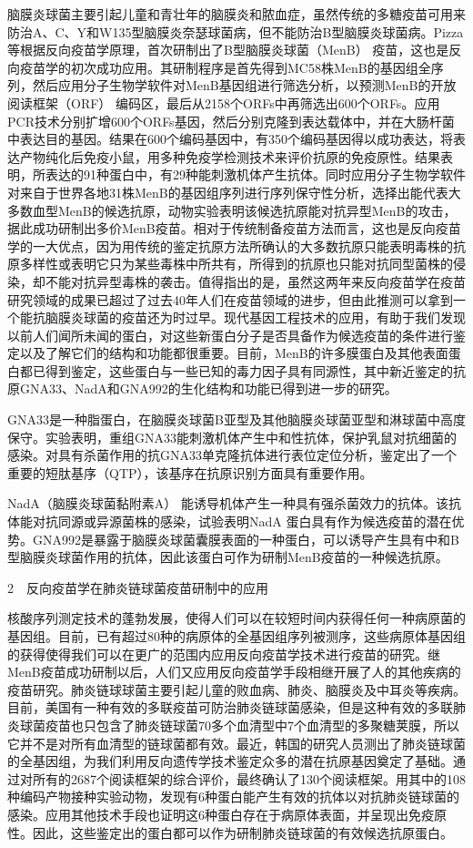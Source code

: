 脑膜炎球菌主要引起儿童和青壮年的脑膜炎和脓血症，虽然传统的多糖疫苗可用来防治A、C、Y和W135型脑膜炎奈瑟球菌病，但不能防治B型脑膜炎球菌病。Pizza等根据反向疫苗学原理，首次研制出了B型脑膜炎球菌（MenB）
疫苗，这也是反向疫苗学的初次成功应用。其研制程序是首先得到MC58株MenB的基因组全序列，然后应用分子生物学软件对MenB基因组进行筛选分析，以预测MenB的开放阅读框架（ORF）
编码区，最后从2158个ORFs中再筛选出600个ORFs。应用PCR技术分别扩增600个ORFs基因，然后分别克隆到表达载体中，并在大肠杆菌中表达目的基因。结果在600个编码基因中，有350个编码基因得以成功表达，将表达产物纯化后免疫小鼠，用多种免疫学检测技术来评价抗原的免疫原性。结果表明，所表达的91种蛋白中，有29种能刺激机体产生抗体。同时应用分子生物学软件对来自于世界各地31株MenB的基因组序列进行序列保守性分析，选择出能代表大多数血型MenB的候选抗原，动物实验表明该候选抗原能对抗异型MenB的攻击，据此成功研制出多价MenB疫苗。相对于传统制备疫苗方法而言，这也是反向疫苗学的一大优点，因为用传统的鉴定抗原方法所确认的大多数抗原只能表明毒株的抗原多样性或表明它只为某些毒株中所共有，所得到的抗原也只能对抗同型菌株的侵染，却不能对抗异型毒株的袭击。值得指出的是，虽然这两年来反向疫苗学在疫苗研究领域的成果已超过了过去40年人们在疫苗领域的进步，但由此推测可以拿到一个能抗脑膜炎球菌的疫苗还为时过早。现代基因工程技术的应用，有助于我们发现以前人们闻所未闻的蛋白，对这些新蛋白分子是否具备作为候选疫苗的条件进行鉴定以及了解它们的结构和功能都很重要。目前，MenB的许多膜蛋白及其他表面蛋白都已得到鉴定，这些蛋白与一些已知的毒力因子具有同源性，其中新近鉴定的抗原GNA33、NadA和GNA992的生化结构和功能已得到进一步的研究。

GNA33是一种脂蛋白，在脑膜炎球菌B亚型及其他脑膜炎球菌亚型和淋球菌中高度保守。实验表明，重组GNA33能刺激机体产生中和性抗体，保护乳鼠对抗细菌的感染。对具有杀菌作用的抗GNA33单克隆抗体进行表位定位分析，鉴定出了一个重要的短肽基序（QTP），该基序在抗原识别方面具有重要作用。

NadA（脑膜炎球菌黏附素A）
能诱导机体产生一种具有强杀菌效力的抗体。该抗体能对抗同源或异源菌株的感染，试验表明NadA
蛋白具有作为候选疫苗的潜在优势。GNA992是暴露于脑膜炎球菌囊膜表面的一种蛋白，可以诱导产生具有中和B
型脑膜炎球菌作用的抗体，因此该蛋白可作为研制MenB疫苗的一种候选抗原。

2　反向疫苗学在肺炎链球菌疫苗研制中的应用

核酸序列测定技术的蓬勃发展，使得人们可以在较短时间内获得任何一种病原菌的基因组。目前，已有超过80种的病原体的全基因组序列被测序，这些病原体基因组的获得使得我们可以在更广的范围内应用反向疫苗学技术进行疫苗的研究。继MenB疫苗成功研制以后，人们又应用反向疫苗学手段相继开展了人的其他疾病的疫苗研究。肺炎链球球菌主要引起儿童的败血病、肺炎、脑膜炎及中耳炎等疾病。目前，美国有一种有效的多联疫苗可防治肺炎链球菌感染，但是这种有效的多联肺炎球菌疫苗也只包含了肺炎链球菌70多个血清型中7个血清型的多聚糖荚膜，所以它并不是对所有血清型的链球菌都有效。最近，韩国的研究人员测出了肺炎链球菌的全基因组，为我们利用反向遗传学技术鉴定众多的潜在抗原基因奠定了基础。通过对所有的2687个阅读框架的综合评价，最终确认了130个阅读框架。用其中的108
种编码产物接种实验动物，发现有6种蛋白能产生有效的抗体以对抗肺炎链球菌的感染。应用其他技术手段也证明这6种蛋白存在于病原体表面，并呈现出免疫原性。因此，这些鉴定出的蛋白都可以作为研制肺炎链球菌的有效候选抗原蛋白。

